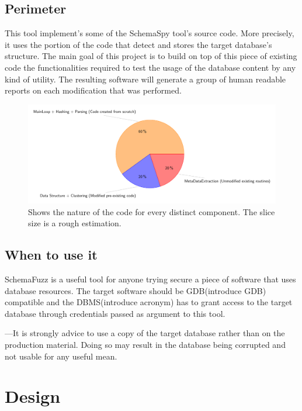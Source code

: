 \documentclass{article}
\begin{document}
\begin{empfile}
		\subsection{Perimeter}
This tool implement's some of the SchemaSpy tool's source code. More precisely, it uses the portion of the code that detect and stores the target database's structure.
The main goal of this project is to build on top of this piece of existing code the functionalities required to test the usage of the database content by any kind of utility.  		
The resulting software will generate a group of human readable reports on each modification that was performed.		
		\begin{figure} [h!]
		\includegraphics[width=\textwidth]{codeOriginDiagram.pdf}
		\caption{Shows the nature of the code for every distinct component. The slice size is a rough estimation.}
		\end{figure}
		\subsection{When to use it}
SchemaFuzz is a   useful tool for anyone trying secure a piece of software that uses database resources. The target software should be GDB(introduce GDB) compatible and the DBMS(introduce acronym) has to grant access to the target database through credentials passed as argument to this tool.

---It is   strongly advice to use a copy of the target database rather than on the production material. Doing so may result in the database being corrupted and not usable for any useful mean.

		\clearpage

	\section{Design}

\end{empfile}
\end{document}
